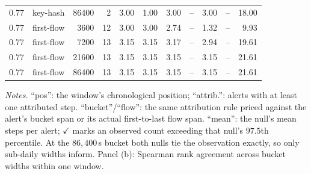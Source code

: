 \begin{table}[t]
{\begin{tabular}{rlrrrrrcrcr}
0.77 & key-hash & 86400 & 2 & 3.00 & 1.00 & 3.00 & -- & 3.00 & -- & 18.00 \\
0.77 & first-flow & 3600 & 12 & 3.00 & 3.00 & 2.74 & -- & 1.32 & -- & 9.93 \\
0.77 & first-flow & 7200 & 13 & 3.15 & 3.15 & 3.17 & -- & 2.94 & -- & 19.61 \\
0.77 & first-flow & 21600 & 13 & 3.15 & 3.15 & 3.15 & -- & 3.15 & -- & 21.61 \\
0.77 & first-flow & 86400 & 13 & 3.15 & 3.15 & 3.15 & -- & 3.15 & -- & 21.61 \\
\bottomrule
\end{tabular}}

\vspace{4pt}
\par\vspace{3pt}
{\footnotesize\raggedright \emph{Notes.} ``pos'': the window's chronological position; ``attrib.'': alerts
with at least one attributed step.
``bucket''/``flow'': the same attribution rule priced against the alert's bucket span or its actual
first-to-last flow span. ``mean'': the null's mean steps per alert; $\checkmark$ marks an observed count
exceeding that null's $97.5$th percentile. At the $86{,}400$\,s bucket both nulls tie the observation
exactly, so only sub-daily widths inform. Panel (b): Spearman rank agreement across bucket widths
within one window.\par}
\end{table}
